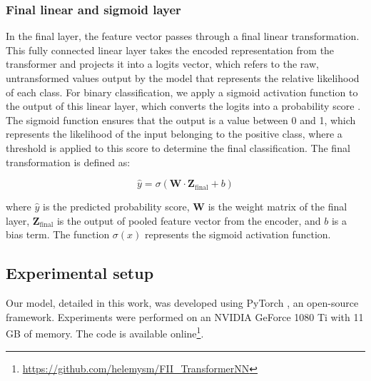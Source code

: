 \subsubsection{Final linear and sigmoid layer}
\label{sec:finallayer_softmax}
In the final layer, the feature vector passes through a final linear transformation. This fully connected linear layer takes the encoded representation from the transformer and projects it into a logits vector, which refers to the raw, untransformed values output by the model that represents the relative likelihood of each class. For binary classification, we apply a sigmoid activation function to the output of this linear layer, which converts the logits into a probability score \citep{goodfellow2016deep}. The sigmoid function ensures that the output is a value between 0 and 1, which represents the likelihood of the input belonging to the positive class, where a threshold is applied to this score to determine the final classification. The final transformation is defined as: \par 

\begin{equation}
    \hat{y} = \sigma (\mathbf{W} \cdot \mathbf{Z}_{\mathrm{final}} + b)
\end{equation}

where $\hat{y}$ is the predicted probability score, $\mathbf{W}$ is the weight matrix of the final layer, $\mathbf{Z}_{\mathrm{final}}$ is the output of pooled feature vector from the encoder, and $b$ is a bias term. The function $\sigma (x)$ represents the sigmoid activation function.



\subsection{Experimental setup}
\label{sec:experimental_setup}

Our model, detailed in this work, was developed using PyTorch \cite{paszke2019pytorch}, an open-source framework. Experiments were performed on an NVIDIA GeForce 1080 Ti with 11 GB of memory. The code is available online\footnote{\url{https://github.com/helemysm/FII_TransformerNN}}.

